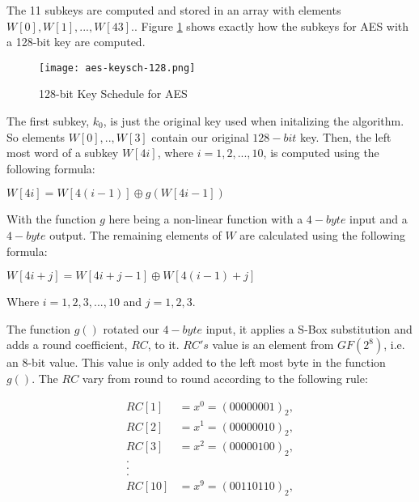 The 11 subkeys are computed and stored in an array with elements $W[0], W[1], ..., W[43].$. Figure \ref{AES-KeySch-128} shows exactly how the subkeys for AES with a 128-bit key are computed. 

\begin{figure}[h!]
\begin{center}
\texttt{[image: aes-keysch-128.png]}
\end{center}
\caption{128-bit Key Schedule for AES}
\label{AES-KeySch-128}
\end{figure}

The first subkey, $k_0$, is just the original key used when initalizing the algorithm. So elements $W[0], .., W[3]$ contain our original $128-bit$ key. Then, the left most word of a subkey $W[4i]$, where $i = 1,2,...,10$, is computed using the following formula:

\begin{center}
$W[4i] = W[4(i - 1)] \oplus g(W[4i - 1])$
\end{center}

With the function $g$ here being a non-linear function with a $4-byte$ input and a $4-byte$ output. The remaining elements of $W$ are calculated using the following formula:

\begin{center}
$W[4i + j] = W[4i + j - 1] \oplus W[4(i - 1) + j]$

Where $i = 1,2,3,...,10$ and $j = 1,2,3$. 
\end{center}

The function $g()$ rotated our $4-byte$ input, it applies a S-Box substitution and adds a round coefficient, $RC$, to it. $RC's$ value is an element from $GF(2^8)$, i.e. an 8-bit value. This value is only added to the left most byte in the function $g()$. The $RC$ vary from round to round according to the following rule:

\begin{center}
\begin{align*}
RC[1] &= x^0 = (0000 0001)_2, \\
RC[2] &= x^1 = (0000 0010)_2, \\
RC[3] &= x^2 = (0000 0100)_2, \\
. \\
. \\
. \\
RC[10] &= x^9 = (0011 0110)_2,  
\end{align*}
\end{center}  

